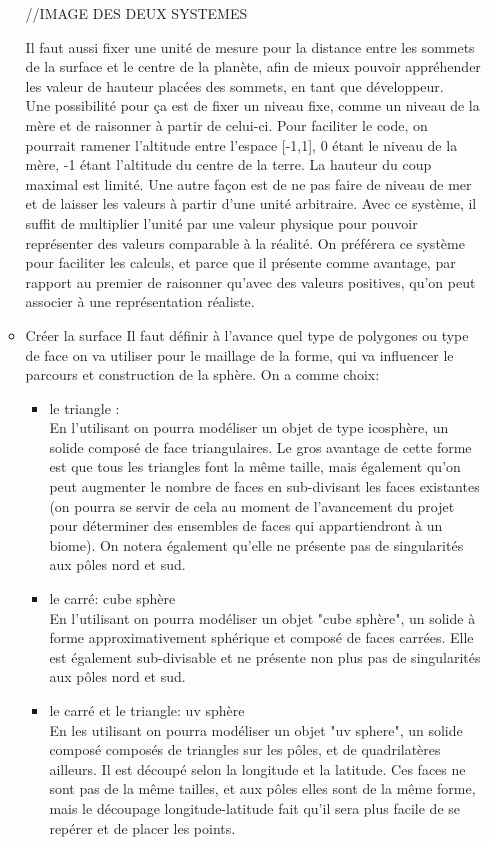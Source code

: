 \documentclass[a4paper]{article}
\begin{document}
\begin{enumerate}
\begin{itemize}
            //IMAGE DES DEUX SYSTEMES
            
            Il faut aussi fixer une unité de mesure pour la distance entre les sommets de la surface et le centre de la planète, afin de mieux pouvoir appréhender les valeur de hauteur placées des sommets, en tant que développeur. \\
            Une possibilité pour ça est de fixer un niveau fixe, comme un niveau de la mère et de raisonner à partir de celui-ci. Pour faciliter le code, on pourrait ramener l'altitude entre l'espace [-1,1], 0 étant le niveau de la mère, -1 étant l'altitude du centre de la terre. La hauteur du coup maximal est limité. Une autre façon est de ne pas faire de niveau de mer et de laisser les valeurs à partir d'une unité arbitraire. Avec ce système, il suffit de multiplier l'unité par une valeur physique pour pouvoir représenter des valeurs comparable à la réalité. On préférera ce système pour faciliter les calculs, et parce que il présente comme avantage, par rapport au premier de raisonner qu'avec des valeurs positives, qu'on peut associer à une représentation réaliste.\\
            
            \item {Créer la surface}
            Il faut définir à l'avance quel type de polygones ou type de face on va utiliser pour le maillage de la forme, qui va influencer le parcours et construction de la sphère. On a comme choix:
            \begin{itemize}
                \item{le triangle :}\\
                En l'utilisant on pourra modéliser un objet de type icosphère, un solide composé de face triangulaires. Le gros avantage de cette forme est que tous les triangles font la même taille, mais également qu'on peut augmenter le nombre de faces en sub-divisant les faces existantes (on pourra se servir de cela au moment de l'avancement du projet pour déterminer des ensembles de faces qui appartiendront à un biome). On notera également qu'elle ne présente pas de singularités aux pôles nord et sud.
                \item{le carré: cube sphère}\\
                En l'utilisant on pourra modéliser un objet "cube sphère", un solide à forme approximativement sphérique et composé de faces carrées. Elle est également sub-divisable et ne présente non plus pas de singularités aux pôles nord et sud.
                \item{le carré et le triangle: uv sphère}\\
                En les utilisant on pourra modéliser un objet "uv sphere", un solide composé composés de triangles sur les pôles, et de quadrilatères ailleurs. Il est découpé selon la longitude et la latitude. Ces faces ne sont pas de la même tailles, et aux pôles elles sont de la même forme, mais le découpage longitude-latitude fait qu'il sera plus facile de se repérer et de placer les points.
            \end{itemize}
            

\end{itemize}
\end{enumerate}
\end{document}
